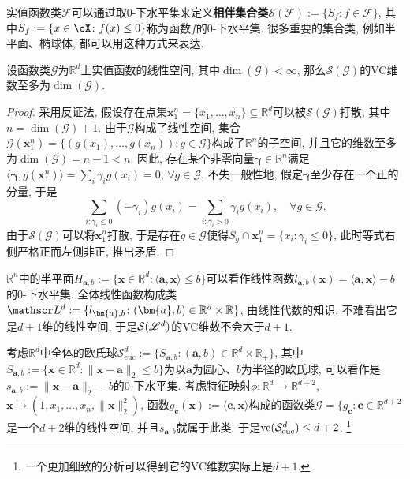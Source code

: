 实值函数类$\mathscr{F}$可以通过取$0$-下水平集来定义\textbf{相伴集合类}$\mathcal{S}(\mathscr{F}):=\{S_f \colon f \in \mathscr{F}\}$, 其中$S_f := \{x \in \cX \colon f(x) \leq 0\}$称为函数$f$的$0$-下水平集. 
很多重要的集合类, 例如半平面、椭球体, 都可以用这种方式来表达. 

\begin{proposition}
	设函数类$\mathscr{G}$为$\mathbb{R}^d$上实值函数的线性空间, 其中$\dim(\mathscr{G}) < \infty$, 那么$\mathcal{S}(\mathscr{G})$的VC维数至多为$\dim(\mathscr{G})$. 	
\end{proposition}
\begin{proof}
	采用反证法, 假设存在点集$\bm{x}_1^n = \{x_1, \dots, x_n\} \subseteq \mathbb{R}^d$可以被$\mathcal{S}(\mathscr{G})$打散, 其中$n = \dim(\mathscr{G}) + 1$.
	由于$\mathscr{G}$构成了线性空间, 集合$\mathscr{G}(\bm{x}_1^n) = \{(g(x_1), \dots, g(x_n)) \colon g \in \mathscr{G}\}$构成了$\mathbb{R}^n$的子空间, 并且它的维数至多为$\dim(\mathscr{G}) = n-1 < n$. 
	因此, 存在某个非零向量$\bm\gamma \in \mathbb{R}^n$满足$\langle \bm{\gamma}, g(\bm{x}_1^n) \rangle = \sum_i \gamma_i g(x_i) = 0$, $\forall g \in \mathscr{G}$. 
	不失一般性地, 假定$\bm{\gamma}$至少存在一个正的分量, 于是
	\begin{equation*}
		\sum_{i \colon \gamma_i \leq 0} (-\gamma_i) g(x_i)
		= \sum_{i \colon \gamma_i > 0} \gamma_i g(x_i), \quad
		\forall g \in \mathscr{G}. 
	\end{equation*}
	由于$\mathcal{S}(\mathscr{G})$可以将$\bm{x}_1^n$打散, 于是存在$g \in \mathscr{G}$使得$S_g \cap \bm{x}_1^n = \{x_i \colon \gamma_i \leq 0\}$, 此时等式右侧严格正而左侧非正, 推出矛盾. 
\end{proof}

\begin{example}
	$\mathbb{R}^n$中的半平面$H_{\bm{a},b} := \{\bm{x} \in \mathbb{R}^d \colon \langle \bm{a}, \bm{x} \rangle  \leq b\}$可以看作线性函数$l_{\bm{a},b}(\bm{x}) = \langle \bm{a}, \bm{x} \rangle - b$的$0$-下水平集. 
	全体线性函数构成类$\sL^d := \{l_{\bm{a},b} \colon (\bm{a}, b) \in \mathbb{R}^d \times \mathbb{R} \}$, 由线性代数的知识, 不难看出它是$d+1$维的线性空间, 于是$\mathcal{S}(\mathscr{L}^d)$的VC维数不会大于$d+1$. 
\end{example}


\begin{example}
	考虑$\mathbb{R}^d$中全体的欧氏球$\mathcal{S}^d_{\text{euc}} := \{S_{\bm{a},b} \colon (\bm{a},b) \in \mathbb{R}^d \times \mathbb{R}_{+}\}$, 其中$S_{\bm{a},b} := \{\bm{x} \in \mathbb{R}^d \colon \|\bm{x} - \bm{a}\|_2 \leq b\}$为以$\bm{a}$为圆心、$b$为半径的欧氏球, 可以看作是$s_{\bm{a},b} := \|\bm{x} - \bm{a}\|_2 - b$的$0$-下水平集. 
	考虑特征映射$\phi \colon \mathbb{R}^d \to \mathbb{R}^{d+2}$, $\bm{x} \mapsto \left(1, x_1, \dots, x_n, \|\bm{x}\|_2^2 \right)$, 函数$g_{\bm{c}}(\bm{x}) := \langle\bm{c}, \bm{x}\rangle$构成的函数类$\mathscr{G} = \{g_{\bm{c}} \colon \bm{c} \in \mathbb{R}^{d+2}$是一个$d+2$维的线性空间, 并且$s_{\bm{a},b}$就属于此类. 
	于是$\mathrm{vc}(\mathcal{S}^d_{\text{euc}}) \leq d+2$. \footnote{一个更加细致的分析可以得到它的VC维数实际上是$d+1$.}
\end{example}


